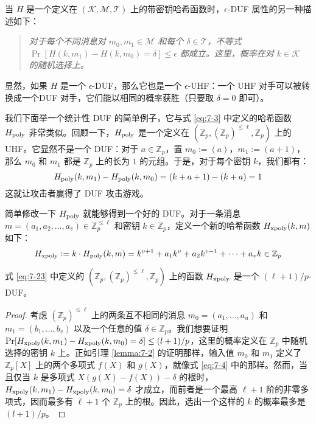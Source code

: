 当 $H$ 是一个定义在 $(\mathcal{K},\mathcal{M},\mathcal{T})$ 上的带密钥哈希函数时，$\epsilon$-DUF 属性的另一种描述如下：
\begin{quote}
\emph{对于每个不同消息对 $m_0,m_1\in\mathcal{M}$ 和每个 $\delta\in\mathcal{T}$，不等式 $\Pr[H(k,m_1)-H(k,m_0)=\delta]\leq\epsilon$ 都成立。这里，概率在对 $k\in\mathcal{K}$ 的随机选择上。}
\end{quote}

显然，如果 $H$ 是一个 $\epsilon$-DUF，那么它也是一个 $\epsilon$-UHF：一个 UHF 对手可以被转换成一个DUF 对手，它们能以相同的概率获胜（只要取 $\delta=0$ 即可）。

我们下面举一个统计性 DUF 的简单例子，它与式 \ref{eq:7-3} 中定义的哈希函数 $H_{\rm poly}$ 非常类似。回顾一下，$H_{\rm poly}$ 是一个定义在 $(\mathbb{Z}_p,(\mathbb{Z}_p)^{\leq\ell},\mathbb{Z}_p)$ 上的 UHF。它显然不是一个 DUF：对于 $a\in\mathbb{Z}_p$，置 $m_0:=(a)$，$m_1:=(a+1)$，那么 $m_0$ 和 $m_1$ 都是 $\mathbb{Z}_p$ 上的长为 $1$ 的元组。于是，对于每个密钥 $k$，我们都有：
\[
H_{\rm poly}(k,m_1)-H_{\rm poly}(k,m_0)=(k+a+1)-(k+a)=1
\]
这就让攻击者赢得了 DUF 攻击游戏。

简单修改一下 $H_{\rm poly}$ 就能够得到一个好的 DUF。对于一条消息 $m=(a_1,a_2,\dots,a_v)\in\mathbb{Z}_p^{\leq\ell}$ 和密钥 $k\in\mathbb{Z}_p$，定义一个新的哈希函数 $H_{\rm xpoly}(k,m)$ 如下：
\begin{equation}\label{eq:7-23}
H_{\rm xpoly}:=k\cdot H_{\rm poly}(k,m)=k^{v+1}+a_1k^v+a_2k^{v-1}+\cdots+a_vk\in\mathbb{Z}_p
\end{equation}

\begin{lemma}\label{lemma:7-8}
式 \ref{eq:7-23} 中定义的 $(\mathbb{Z}_p,(\mathbb{Z}_p)^{\leq\ell},\mathbb{Z}_p)$ 上的函数 $H_{\rm xpoly}$ 是一个 ${(\ell+1)}/{p}$-DUF。
\end{lemma}

\begin{proof}
考虑 $(\mathbb{Z}_p)^{\leq\ell}$ 上的两条互不相同的消息 $m_0=(a_1,\dots,a_u)$ 和 $m_1=(b_1,\dots,b_v)$ 以及一个任意的值 $\delta\in\mathbb{Z}_p$。我们想要证明 $\Pr[H_{\rm xpoly}(k,m_1)-H_{\rm xpoly}(k,m_0)=\delta]\leq{(l+1)}/{p}$，这里的概率定义在 $\mathbb{Z}_p$ 中随机选择的密钥 $k$ 上。正如引理 \ref{lemma:7-2} 的证明那样，输入值 $m_0$ 和 $m_1$ 定义了 $\mathbb{Z}_p[X]$ 上的两个多项式 $f(X)$ 和 $g(X)$，就像式 \ref{eq:7-4} 中的那样。然而，当且仅当 $k$ 是多项式 $X(g(X)-f(X))-\delta$ 的根时，$H_{\rm xpoly}(k,m_1)-H_{\rm xpoly}(k,m_0)=\delta$ 才成立，而前者是一个最高 $\ell+1$ 阶的非零多项式，因而最多有 $\ell+1$ 个 $\mathbb{Z}_p$ 上的根。因此，选出一个这样的 $k$ 的概率最多是 ${(l+1)}/{p}$。
\end{proof}

